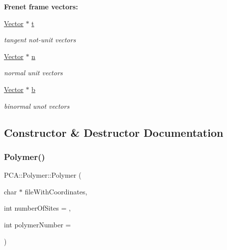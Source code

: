 \begin{Indent}{\bf Frenet frame vectors\+:}\par
\begin{DoxyCompactItemize}
\item 
\hyperlink{class_p_c_a_1_1_vector}{Vector} $\ast$ \hyperlink{class_p_c_a_1_1_polymer_a0fd79e19a8c09a9e4c72903924151b5e}{t}
\begin{DoxyCompactList}\small\item\em tangent not-\/unit vectors \end{DoxyCompactList}\item 
\hyperlink{class_p_c_a_1_1_vector}{Vector} $\ast$ \hyperlink{class_p_c_a_1_1_polymer_a7c71d8f5516ae0b0ead3929296135d1b}{n}
\begin{DoxyCompactList}\small\item\em normal unit vectors \end{DoxyCompactList}\item 
\hyperlink{class_p_c_a_1_1_vector}{Vector} $\ast$ \hyperlink{class_p_c_a_1_1_polymer_ad93199b0187ab557476153b204b921c7}{b}
\begin{DoxyCompactList}\small\item\em binormal unot vectors \end{DoxyCompactList}\end{DoxyCompactItemize}
\end{Indent}


\subsection{Constructor \& Destructor Documentation}
\hypertarget{class_p_c_a_1_1_polymer_a0553d45df48e7f0995063e9e74fcadb5}{}\label{class_p_c_a_1_1_polymer_a0553d45df48e7f0995063e9e74fcadb5} 
\subsubsection{\texorpdfstring{Polymer()}{Polymer()}\hspace{0.1cm}{\footnotesize\ttfamily [1/3]}}
{\footnotesize\ttfamily P\+C\+A\+::\+Polymer\+::\+Polymer (\begin{DoxyParamCaption}\item[{char $\ast$}]{file\+With\+Coordinates,  }\item[{int}]{number\+Of\+Sites = {},  }\item[{int}]{polymer\+Number = {} }\end{DoxyParamCaption})}



